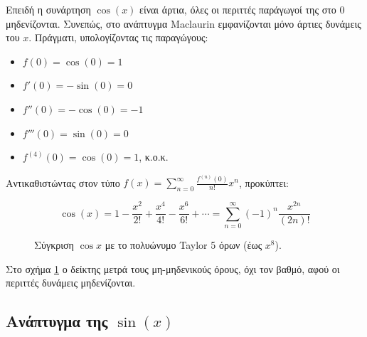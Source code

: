 \documentclass[a4paper, 11pt]{article}
\providecommand{\tightlist}{\setlength{\itemsep}{0pt}\setlength{\parskip}{0pt}}
\begin{document}
Επειδή η συνάρτηση \(\cos(x)\) είναι άρτια, όλες οι περιττές παράγωγοί
της στο 0 μηδενίζονται. Συνεπώς, στο ανάπτυγμα Maclaurin εμφανίζονται
μόνο άρτιες δυνάμεις του \(x\). Πράγματι, υπολογίζοντας τις παραγώγους:

\begin{itemize}
\tightlist
\item
  \(f(0) = \cos(0) = 1\)
\item
  \(f'(0) = -\sin(0) = 0\)
\item
  \(f''(0) = -\cos(0) = -1\)
\item
  \(f'''(0) = \sin(0) = 0\)
\item
  \(f^{(4)}(0) = \cos(0) = 1\), κ.ο.κ.
\end{itemize}

Αντικαθιστώντας στον τύπο
\(f(x)=\sum_{n=0}^{\infty} \frac{f^{(n)}(0)}{n!}x^n\), προκύπτει:

\[
\cos(x) = 1 - \frac{x^2}{2!} + \frac{x^4}{4!} - \frac{x^6}{6!} + \cdots = \sum_{n=0}^{\infty} (-1)^n \frac{x^{2n}}{(2n)!}
\]

\begin{figure}[htbp]
\centering
{}
\caption{Σύγκριση $\cos x$ με το πολυώνυμο Taylor 5 όρων (έως $x^8$).}
\label{fig:costaylor5}
\end{figure}

Στο σχήμα \ref{fig:costaylor5} ο δείκτης μετρά τους μη-μηδενικούς όρους,
όχι τον βαθμό, αφού οι περιττές δυνάμεις μηδενίζονται.

\subsection{\texorpdfstring{Ανάπτυγμα της
\(\sin(x)\)}{Ανάπτυγμα της \textbackslash sin(x)}}\label{ux3b1ux3bdux3acux3c0ux3c4ux3c5ux3b3ux3bcux3b1-ux3c4ux3b7ux3c2-sinx}
\end{document}
